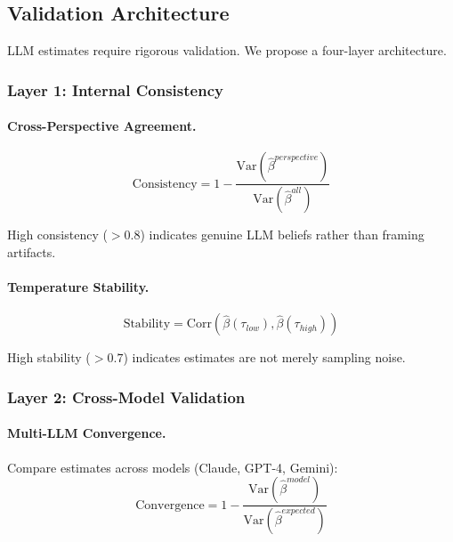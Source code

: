 \subsection{Validation Architecture}

LLM estimates require rigorous validation. We propose a four-layer architecture.

\subsubsection{Layer 1: Internal Consistency}

\paragraph{Cross-Perspective Agreement.}
\begin{equation}
\text{Consistency} = 1 - \frac{\text{Var}(\hat{\beta}^{perspective})}{\text{Var}(\hat{\beta}^{all})}
\end{equation}

High consistency ($> 0.8$) indicates genuine LLM beliefs rather than framing artifacts.

\paragraph{Temperature Stability.}
\begin{equation}
\text{Stability} = \text{Corr}(\hat{\beta}(\tau_{low}), \hat{\beta}(\tau_{high}))
\end{equation}

High stability ($> 0.7$) indicates estimates are not merely sampling noise.

\subsubsection{Layer 2: Cross-Model Validation}

\paragraph{Multi-LLM Convergence.}
Compare estimates across models (Claude, GPT-4, Gemini):
\begin{equation}
\text{Convergence} = 1 - \frac{\text{Var}(\hat{\beta}^{model})}{\text{Var}(\hat{\beta}^{expected})}
\end{equation}

